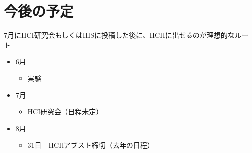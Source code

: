 \documentclass[11pt,a4paper]{jarticle}
\begin{document}
\section{今後の予定}
7月にHCI研究会もしくはHISに投稿した後に、HCIIに出せるのが理想的なルート
\begin{itemize}
  \item 6月
  \begin{itemize}
    \item 実験
  \end{itemize}
  \item 7月
  \begin{itemize}
    \item HCI研究会（日程未定）
  \end{itemize}
  \item 8月
  \begin{itemize}
    \item 31日　HCIIアブスト締切（去年の日程）
  \end{itemize}
\end{itemize}


\end{document}
